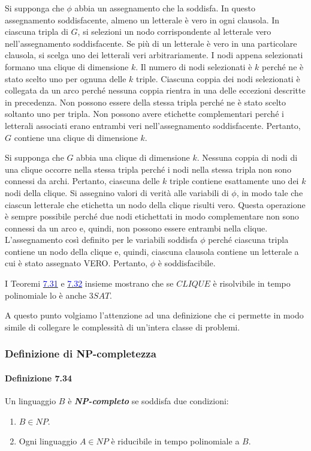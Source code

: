 \documentclass{article}
\begin{document}
Si supponga che $\phi$ abbia un assegnamento che la soddisfa.
In questo assegnamento soddisfacente, almeno un letterale è vero in ogni clausola.
In ciascuna tripla di $G$, si selezioni un nodo corrispondente al letterale vero nell'assegnamento soddisfacente. 
Se più di un letterale è vero in una particolare clausola, si scelga uno dei letterali veri arbitrariamente. 
I nodi appena selezionati formano una clique di dimensione $k$. 
Il numero di nodi selezionati è $k$ perché ne è stato scelto uno per ognuna delle $k$ triple.
Ciascuna coppia dei nodi selezionati è collegata da un arco perché nessuna coppia rientra in una delle eccezioni descritte in precedenza. 
Non possono essere della stessa tripla perché ne è stato scelto soltanto uno per tripla.
Non possono avere etichette complementari perché i letterali associati erano entrambi veri nell'assegnamento soddisfacente. 
Pertanto, $G$ contiene una clique di dimensione $k$.

Si supponga che $G$ abbia una clique di dimensione $k$. 
Nessuna coppia di nodi di una clique occorre nella stessa tripla perché i nodi nella stessa tripla non sono connessi da archi. 
Pertanto, ciascuna delle $k$ triple contiene esattamente uno dei $k$ nodi della clique. 
Si assegnino valori di verità alle
variabili di $\phi$, in modo tale che ciascun letterale che etichetta un nodo della clique risulti vero.
Questa operazione è sempre possibile perché due nodi etichettati in modo complementare non sono connessi da un arco e, quindi, non possono essere entrambi nella clique.
L'assegnamento così definito per
le variabili soddisfa $\phi$ perché ciascuna tripla contiene un nodo della clique e, quindi, ciascuna clausola contiene un letterale a cui è stato assegnato VERO. 
Pertanto, $\phi$ è soddisfacibile.

I Teoremi \hyperref[teorema-7.31]{\textcolor{blue}{7.31}} e \hyperref[teorema-7.32]{\textcolor{blue}{7.32}} insieme mostrano che se $CLIQUE$ è risolvibile in tempo polinomiale lo è anche $3SAT$.

A questo punto volgiamo l'attenzione ad una definizione che ci permette in modo simile di collegare le complessità di un'intera classe di problemi.

\newpage
\subsubsection{Definizione di NP-completezza}
\paragraph{Definizione 7.34}
\label{definizione-7.34}
\vspace{1em}
\text{}
\newline
\begin{tcolorbox}
    Un linguaggio $B$ è \textit{\textbf{NP-completo}} se soddisfa due condizioni:
    \begin{enumerate}
        \item $B \in NP$.
        \item Ogni linguaggio $A \in NP$ è riducibile in tempo polinomiale a $B$.
    \end{enumerate}
\end{tcolorbox}
\end{document}
